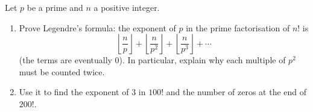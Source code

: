 Let $p$ be a prime and $n$ a positive integer.
\begin{enumerate}
\item[(a)] Prove Legendre's formula: the exponent of $p$ in the prime factorisation of $n!$ is
\[
\left\lfloor\dfrac{n}{p}\right\rfloor+\left\lfloor\dfrac{n}{p^2}\right\rfloor+\left\lfloor\dfrac{n}{p^3}\right\rfloor+\cdots
\]
(the terms are eventually $0$). In particular, explain why each multiple of $p^2$ must be counted twice.
\item[(b)] Use it to find the exponent of $3$ in $100!$ and the number of zeros at the end of $200!$.
\end{enumerate}
